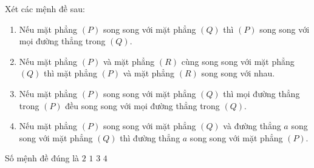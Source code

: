 \begin{ex}%
Xét các mệnh đề sau:
\begin{enumerate}
\item Nếu mặt phẳng $(P)$ song song với mặt phẳng $(Q)$ thì $(P)$ song song với mọi đường thẳng trong $(Q)$.
\item Nếu mặt phẳng $(P)$ và mặt phẳng $(R)$ cùng  song song với mặt phẳng $(Q)$ thì mặt phẳng $(P)$ và mặt phẳng $(R)$ song song với nhau.
\item  Nếu mặt phẳng $(P)$ song song với mặt phẳng $(Q)$ thì mọi đường thẳng trong $(P)$ đều song song với mọi đường thẳng 
trong $(Q)$. 
\item Nếu mặt phẳng $(P)$ song song với mặt phẳng $(Q)$ và đường thẳng $a$ song song với mặt phẳng $(Q)$ thì đường thẳng $a$ 
song song với mặt phẳng $(P)$. 
\end{enumerate}
Số mệnh đề đúng là
\choice
{$2$}
{\True $1$}
{$3$}
{$4$}
\end{ex}





